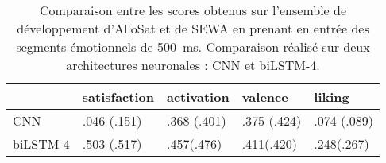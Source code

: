 \begin{table}[htp!]
    \centering
    \begin{tabular}{|l|l||l|l|l|}
        \hline
                    &satisfaction &activation &valence &liking \\
        \hline
        CNN         &.046 (.151)   &.368 (.401) &.375 (.424) &.074 (.089)\\
        biLSTM-4    &.503 (.517)   &.457(.476) &.411(.420) &.248(.267) \\
        \hline
    \end{tabular}
    \caption{Comparaison entre les scores obtenus sur l'ensemble de développement d'AlloSat et de SEWA en prenant en entrée des segments émotionnels de 500~ms. Comparaison réalisé sur deux architectures neuronales : CNN et biLSTM-4.}
    \label{tab:pasAnnotation}
\end{table}
